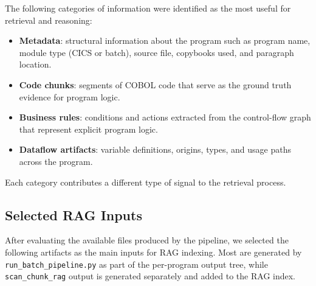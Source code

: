 \documentclass[11pt]{article}
\begin{document}
The following categories of information were identified as the most useful for retrieval and reasoning:

\begin{itemize}
\item \textbf{Metadata}: structural information about the program such as program name, module type (CICS or batch), source file, copybooks used, and paragraph location.
\item \textbf{Code chunks}: segments of COBOL code that serve as the ground truth evidence for program logic.
\item \textbf{Business rules}: conditions and actions extracted from the control-flow graph that represent explicit program logic.
\item \textbf{Dataflow artifacts}: variable definitions, origins, types, and usage paths across the program.
\end{itemize}

Each category contributes a different type of signal to the retrieval process.

\subsection*{Selected RAG Inputs}

After evaluating the available files produced by the pipeline, we selected the following artifacts as the main inputs for RAG indexing. Most are generated by \texttt{run\_batch\_pipeline.py} as part of the per-program output tree, while \texttt{scan\_chunk\_rag} output is generated separately and added to the RAG index.
\end{document}
